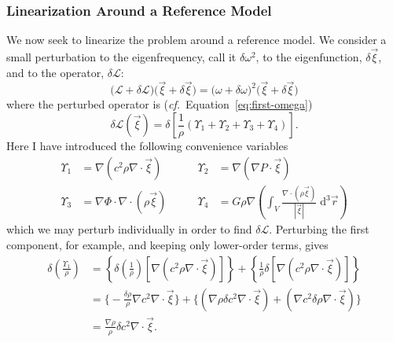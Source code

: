 \subsubsection*{Linearization Around a Reference Model}
We now seek to linearize the problem around a reference model. 
We consider a small perturbation to the eigenfrequency, call it ${\delta\omega^2}$, to the eigenfunction, ${\delta\vec\xi}$, and to the operator, ${\delta\mathcal{L}}$:
\begin{equation} \label{eq:perturbed-operator}
    \Big(
        \mathcal{L} + \delta\mathcal{L}
    \Big)
    \Big(
        \vec\xi
        +
        \delta\vec\xi
    \Big)
    =
    \Big(
        \omega
        +
        \delta\omega
    \Big)^2
    \Big(
        \vec\xi
        +
        \delta\vec\xi
    \Big)
\end{equation}
where the perturbed operator is (\emph{cf.}~Equation~\ref{eq:first-omega})
\begin{equation}
    \delta \mathcal{L}(\vec\xi)
    =
    \delta \left[
        \frac{1}{\rho} \left(
            \Upsilon_1 + \Upsilon_2 + \Upsilon_3 + \Upsilon_4
        \right)
    \right].
\end{equation}
Here I have introduced the following convenience variables 
\begin{align}
    \Upsilon_1 &= \nabla \left( c^2 \rho \nabla \cdot \vec\xi \right)
    \qquad 
    & \Upsilon_2 &= \nabla \left( \nabla P \cdot \vec\xi \right) \\
    \Upsilon_3 &= \nabla \Phi \cdot \nabla \cdot \left( \rho \vec\xi \right)
    \qquad
    & \Upsilon_4 &= G\rho \nabla \left( \int_V \frac{\nabla \cdot \left( \rho \vec\xi \right)}{|\vec\xi|} \;\text{d}^3 \vec r  \right)
\end{align}
which we may perturb individually in order to find ${\delta\mathcal{L}}$. 
Perturbing the first component, for example, and keeping only lower-order terms, gives 
\begin{align}
    \delta \left( \frac{\Upsilon_1}{\rho} \right)
    &=
    \left\{
        \delta\left(\frac{1}{\rho}\right) 
        \left[
            \nabla \left( c^2 \rho \nabla \cdot \vec\xi \right) 
        \right]
    \right\}
    +
    \left\{
        \frac{1}{\rho} \delta
        \left[ 
            \nabla \left( c^2 \rho \nabla \cdot \vec\xi \right) 
        \right]
    \right\}
    \\
    &=
    \Big\{
        -\frac{\delta\rho}{\rho} \nabla c^2 \nabla\cdot \vec\xi
    \Big\}
    +
    \Big\{
        \left(
            \nabla\rho \delta c^2 \nabla \cdot \vec\xi
        \right)
        +
        \left(
            \nabla c^2 \delta\rho \nabla \cdot \vec\xi
        \right)
    \Big\}
    \\
    &=
    \frac{\nabla\rho}{\rho} \delta c^2 \nabla\cdot \vec\xi.
\end{align}
